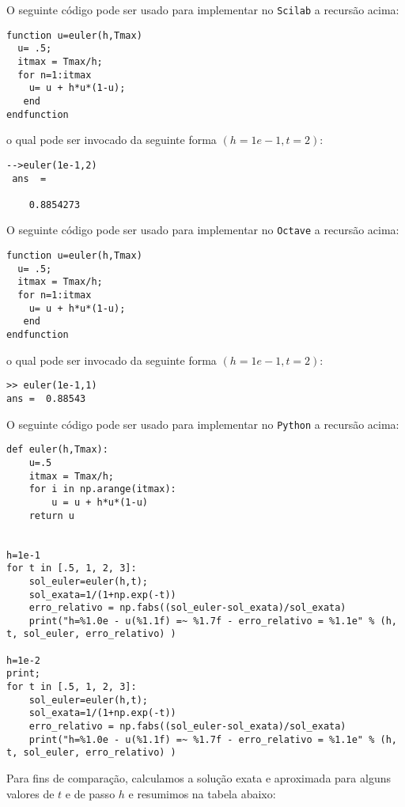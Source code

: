 \ifisscilab
O seguinte código pode ser usado para implementar no \verb+Scilab+ a recursão acima:
\begin{verbatim}
function u=euler(h,Tmax)
  u= .5;
  itmax = Tmax/h;
  for n=1:itmax
    u= u + h*u*(1-u);
   end
endfunction
\end{verbatim}
o qual pode ser invocado da seguinte forma $\left(h=1e-1, t=2\right)$:
\begin{verbatim}
-->euler(1e-1,2)
 ans  =

    0.8854273
\end{verbatim}

\fi

\ifisoctave
O seguinte código pode ser usado para implementar no \verb+Octave+ a recursão acima:
\begin{verbatim}
function u=euler(h,Tmax)
  u= .5;
  itmax = Tmax/h;
  for n=1:itmax
    u= u + h*u*(1-u);
   end
endfunction
\end{verbatim}
o qual pode ser invocado da seguinte forma $\left(h=1e-1, t=2\right)$:
\begin{verbatim}
>> euler(1e-1,1)
ans =  0.88543
\end{verbatim}
\fi


\ifispython
O seguinte código pode ser usado para implementar no \verb+Python+ a recursão acima:

\begin{verbatim}
def euler(h,Tmax):
	u=.5
  	itmax = Tmax/h;
	for i in np.arange(itmax):
		u = u + h*u*(1-u)
	return u


h=1e-1
for t in [.5, 1, 2, 3]:
	sol_euler=euler(h,t);
	sol_exata=1/(1+np.exp(-t))
	erro_relativo = np.fabs((sol_euler-sol_exata)/sol_exata)
	print("h=%1.0e - u(%1.1f) =~ %1.7f - erro_relativo = %1.1e" % (h, t, sol_euler, erro_relativo) )

h=1e-2
print;
for t in [.5, 1, 2, 3]:
	sol_euler=euler(h,t);
	sol_exata=1/(1+np.exp(-t))
	erro_relativo = np.fabs((sol_euler-sol_exata)/sol_exata)
	print("h=%1.0e - u(%1.1f) =~ %1.7f - erro_relativo = %1.1e" % (h, t, sol_euler, erro_relativo) )

\end{verbatim}
\fi
Para fins de comparação, calculamos a solução exata e aproximada para alguns valores de $t$ e de passo $h$ e resumimos na tabela abaixo:

